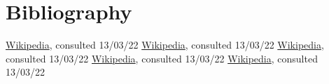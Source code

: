 \documentclass[twocolumn]{article}
\begin{document}
\section{Bibliography}
\begin{thebibliography}{9}
     \href{https://en.wikipedia.org/wiki/Ammonium_iron(II)_sulfate}{Wikipedia}, consulted 13/03/22
     \href{https://en.wikipedia.org/wiki/Sodium_acetate}{Wikipedia}, consulted 13/03/22
     \href{https://en.wikipedia.org/wiki/Hydroxylamine}{Wikipedia}, consulted 13/03/22
     \href{https://en.wikipedia.org/wiki/Phenanthroline}{Wikipedia}, consulted 13/03/22
     \href{https://en.wikipedia.org/wiki/Absorbance}{Wikipedia}, consulted 13/03/22
\end{thebibliography}
\end{document}
